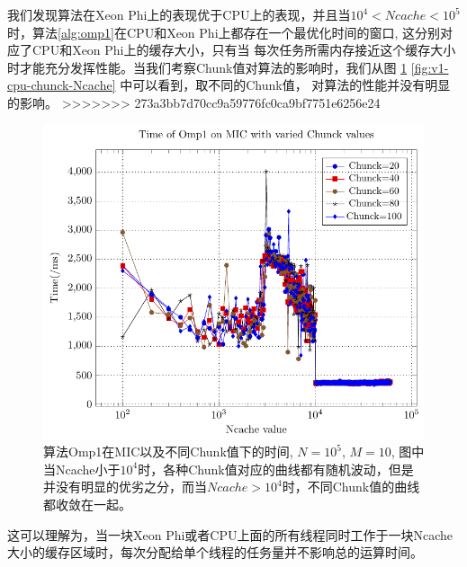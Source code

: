 我们发现算法在Xeon Phi上的表现优于CPU上的表现，并且当$10^4 < Ncache < 10^5$时，算法\ref{alg:omp1}在CPU和Xeon Phi上都存在一个最优化时间的窗口, 
这分别对应了CPU和Xeon Phi上的缓存大小，只有当
每次任务所需内存接近这个缓存大小时才能充分发挥性能。当我们考察Chunk值对算法的影响时，我们从图
\ref{fig:v1-mic-chunck-Ncache} \ref{fig:v1-cpu-chunck-Ncache} 中可以看到，取不同的Chunk值，
对算法的性能并没有明显的影响。
>>>>>>> 273a3bb7d70cc9a59776fc0ca9bf7751e6256e24
\begin{figure}[!t]
   \centering
   \includegraphics[width=\textwidth]{chap5/Figures/bsV1-mic-Time-Chunck.pdf}
   \caption{算法Omp1在MIC以及不同Chunk值下的时间, $N=10^5$, $M=10$, 图中当Ncache小于$10^4$时，各种Chunk值对应的曲线都有随机波动，但是
   并没有明显的优劣之分，而当$Ncache > 10^4$时，不同Chunk值的曲线都收敛在一起。}
   \label{fig:v1-mic-chunck-Ncache}
\end{figure}
这可以理解为，当一块Xeon Phi或者CPU上面的所有线程同时工作于一块Ncache大小的缓存区域时，每次分配给单个线程的任务量并不影响总的运算时间。
